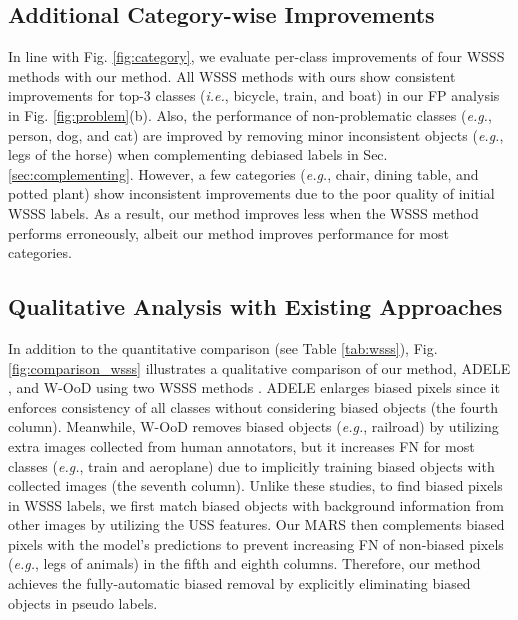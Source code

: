 \documentclass[10pt,twocolumn,letterpaper]{article}
\begin{document}
\subsection{Additional Category-wise Improvements}







In line with Fig. \ref{fig:category}, we evaluate per-class improvements of four WSSS methods \cite{ahn2019weakly, wang2020self, lee2021anti, jo2022recurseed} with our method. All WSSS methods with ours show consistent improvements for top-3 classes (\emph{i.e.}, bicycle, train, and boat) in our FP analysis in Fig. \ref{fig:problem}(b). Also, the performance of non-problematic classes (\emph{e.g.}, person, dog, and cat) are improved by removing minor inconsistent objects (\emph{e.g.}, legs of the horse) when complementing debiased labels in Sec. \ref{sec:complementing}. However, a few categories (\emph{e.g.}, chair, dining table, and potted plant) show inconsistent improvements due to the poor quality of initial WSSS labels. As a result, our method improves less when the WSSS method performs erroneously, albeit our method improves performance for most categories.

\subsection{Qualitative Analysis with Existing Approaches}









In addition to the quantitative comparison (see Table \ref{tab:wsss}), Fig. \ref{fig:comparison_wsss} illustrates a qualitative comparison of our method, ADELE \cite{liu2022adaptive}, and W-OoD \cite{lee2022weakly} using two WSSS methods \cite{wang2020self, lee2021anti}. ADELE \cite{liu2022adaptive} enlarges biased pixels since it enforces consistency of all classes without considering biased objects (the fourth column). Meanwhile, W-OoD \cite{lee2022weakly} removes biased objects (\emph{e.g.}, railroad) by utilizing extra images collected from human annotators, but it increases FN for most classes (\emph{e.g.}, train and aeroplane) due to implicitly training biased objects with collected images (the seventh column). Unlike these studies, to find biased pixels in WSSS labels, we first match biased objects with background information from other images by utilizing the USS features. Our MARS then complements biased pixels with the model's predictions to prevent increasing FN of non-biased pixels (\emph{e.g.}, legs of animals) in the fifth and eighth columns. Therefore, our method achieves the fully-automatic biased removal by explicitly eliminating biased objects in pseudo labels.
\end{document}
